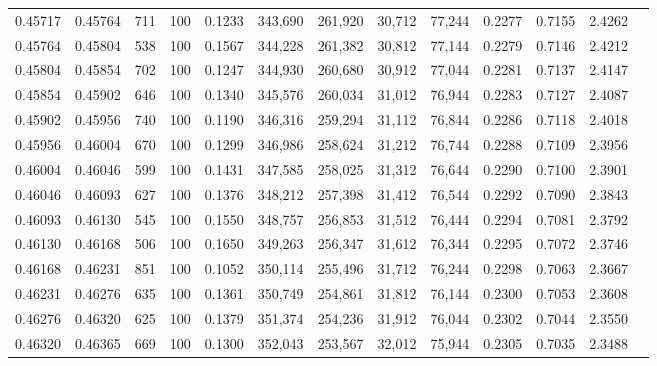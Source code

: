 \begin{tabular}{rrrrrrrrrrrrr}
0.45717 & 0.45764 &   711 & 100 &                                     0.1233 & 343,690 & 261,920 &  30,712 &  77,244 & 0.2277 & 0.7155 & 2.4262 \\
0.45764 & 0.45804 &   538 & 100 &                                     0.1567 & 344,228 & 261,382 &  30,812 &  77,144 & 0.2279 & 0.7146 & 2.4212 \\
0.45804 & 0.45854 &   702 & 100 &                                     0.1247 & 344,930 & 260,680 &  30,912 &  77,044 & 0.2281 & 0.7137 & 2.4147 \\
0.45854 & 0.45902 &   646 & 100 &                                     0.1340 & 345,576 & 260,034 &  31,012 &  76,944 & 0.2283 & 0.7127 & 2.4087 \\
0.45902 & 0.45956 &   740 & 100 &                                     0.1190 & 346,316 & 259,294 &  31,112 &  76,844 & 0.2286 & 0.7118 & 2.4018 \\
0.45956 & 0.46004 &   670 & 100 &                                     0.1299 & 346,986 & 258,624 &  31,212 &  76,744 & 0.2288 & 0.7109 & 2.3956 \\
0.46004 & 0.46046 &   599 & 100 &                                     0.1431 & 347,585 & 258,025 &  31,312 &  76,644 & 0.2290 & 0.7100 & 2.3901 \\
0.46046 & 0.46093 &   627 & 100 &                                     0.1376 & 348,212 & 257,398 &  31,412 &  76,544 & 0.2292 & 0.7090 & 2.3843 \\
0.46093 & 0.46130 &   545 & 100 &                                     0.1550 & 348,757 & 256,853 &  31,512 &  76,444 & 0.2294 & 0.7081 & 2.3792 \\
0.46130 & 0.46168 &   506 & 100 &                                     0.1650 & 349,263 & 256,347 &  31,612 &  76,344 & 0.2295 & 0.7072 & 2.3746 \\
0.46168 & 0.46231 &   851 & 100 &                                     0.1052 & 350,114 & 255,496 &  31,712 &  76,244 & 0.2298 & 0.7063 & 2.3667 \\
0.46231 & 0.46276 &   635 & 100 &                                     0.1361 & 350,749 & 254,861 &  31,812 &  76,144 & 0.2300 & 0.7053 & 2.3608 \\
0.46276 & 0.46320 &   625 & 100 &                                     0.1379 & 351,374 & 254,236 &  31,912 &  76,044 & 0.2302 & 0.7044 & 2.3550 \\
0.46320 & 0.46365 &   669 & 100 &                                     0.1300 & 352,043 & 253,567 &  32,012 &  75,944 & 0.2305 & 0.7035 & 2.3488 \\

\end{tabular}
